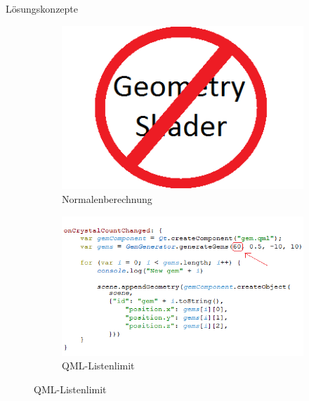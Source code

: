\slideonetoone
{Lösungskonzepte}
{	
	\begin{figure}
		\centering
		\begin{subfigure}{\textwidth}
			\centering
			\includegraphics[width=\textwidth, height=0.3\textheight, keepaspectratio]{images/nogeometry}
			\caption{Normalenberechnung}
		\end{subfigure}
		\begin{subfigure}{\textwidth}
			\centering
			\includegraphics[width=\textwidth, height=0.3\textheight, keepaspectratio]{images/60max}
			\caption{QML-Listenlimit}
		\end{subfigure}
	\end{figure}
}
